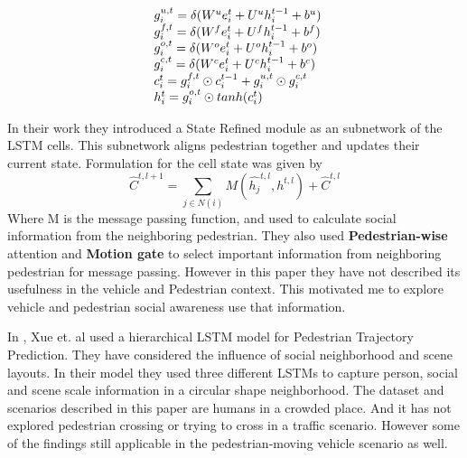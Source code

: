 \begin{equation}
	\begin{array}{l@{}}
	g_i^{u,t} = \delta(W^u e_i^t + U^uh_i^{t-1} + b^u ) \\
	g_i^{f,t} = \delta(W^f e_i^t + U^fh_i^{t-1} + b^f ) \\
	g_i^{o,t} = \delta(W^o e_i^t + U^oh_i^{t-1} + b^o ) \\
	g_i^{c,t} = \delta(W^c e_i^t + U^ch_i^{t-1} + b^c ) \\
	c_i^{t} = g_i^{f,t} \odot c_i^{t-1} + g_i^{u,t} \odot g_i^{c,t} \\
	h_i^{t} = g_i^{o,t} \odot  tanh(c_i^{t}) \\
	\end{array}
\end{equation}

In their work they introduced a State Refined module as an subnetwork of the LSTM cells. This subnetwork aligns pedestrian together and updates their current state. Formulation for the cell state was given by 
\begin{equation}
\hat{C}^{t, l+1}= \sum_{j\in N(i)}M(\hat{h_j}^{t, l}, {h}^{t, l}) + \hat{C}^{t, l}
\end{equation}
Where M is the message passing function, and used to calculate social information from the neighboring pedestrian. They also used \textbf{Pedestrian-wise }attention and \textbf{Motion gate} to select important information from neighboring pedestrian for message passing. However in this paper they have not described its usefulness in the vehicle and Pedestrian context. This motivated me to explore vehicle and pedestrian social awareness use that information.

In \cite{xue2018ss}, Xue et. al used a hierarchical LSTM model for Pedestrian Trajectory Prediction. They have considered the influence of social neighborhood and scene layouts. In their model they used three different LSTMs to capture person, social and scene scale information in a circular shape neighborhood. The dataset and scenarios described in this paper are humans in a crowded place. And it has not explored pedestrian crossing or trying to cross in a traffic scenario. However some of the findings still applicable in the pedestrian-moving vehicle scenario as well.

